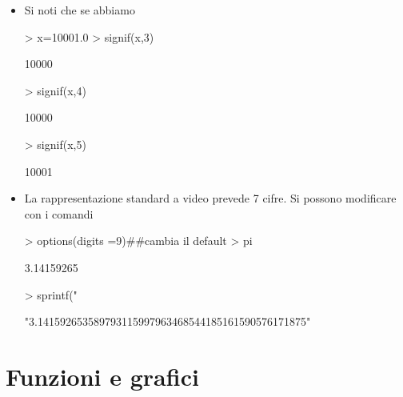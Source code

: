 \documentclass[onecolumn,11pt]{book}
\begin{document}
\begin{itemize}
\item 
Si noti che se abbiamo
\begin{Schunk}
\begin{Sinput}
> x=10001.0
> signif(x,3)
\end{Sinput}
\begin{Soutput}
[1] 10000
\end{Soutput}
\begin{Sinput}
> signif(x,4)
\end{Sinput}
\begin{Soutput}
[1] 10000
\end{Soutput}
\begin{Sinput}
> signif(x,5)
\end{Sinput}
\begin{Soutput}
[1] 10001
\end{Soutput}
\end{Schunk}
\item 
La rappresentazione standard a video prevede 7 cifre. Si possono modificare con i comandi
\begin{Schunk}
\begin{Sinput}
> options(digits =9)##cambia il default
> pi
\end{Sinput}
\begin{Soutput}
[1] 3.14159265
\end{Soutput}
\begin{Sinput}
> sprintf("%
\end{Sinput}
\begin{Soutput}
[1] "3.141592653589793115997963468544185161590576171875"
\end{Soutput}
\end{Schunk}
\end{itemize}                               
\section{Funzioni e grafici}
\end{document}
